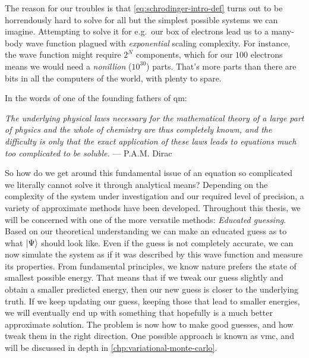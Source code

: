 \documentclass[Thesis.tex]{subfiles}
\begin{document}
The reason for our troubles is that \cref{eq:schrodinger-intro-def} turns out to
be horrendously hard to solve for all but the simplest possible systems we can
imagine. Attempting to solve it for e.g.\ our box of electrons lead us to
a many-body wave function plagued with \emph{exponential} scaling complexity.
For instance, the wave function might require $2^N$ components, which for our
$\num{100}$ electrons means we would need a \emph{nonillion} ($10^{30}$) parts. That's
more parts than there are bits in all the computers of the world, with plenty to
spare.

\begin{comment}
In most other areas of science we have been able to tame the mathematical
challenges through sophisticated high-performance computational frameworks.
Scaling complexities of $N^2$, $N^3$ or similar can usually be overcome by
simply using bigger and better computers, all the way to supercomputers with
hundreds of thousands of cores. But exponential scaling - that becomes
infeasible quickly.
\end{comment}

In the words of one of the founding fathers of \acrshort{qm}:
\begin{displayquote}
\emph{The underlying physical laws necessary for the mathematical theory of a large
part of physics and the whole of chemistry are thus completely known, and the
difficulty is only that the exact application of these laws leads to equations
much too complicated to be soluble.} --- P.A.M. Dirac
\end{displayquote}

So how do we get around this fundamental issue of an equation so complicated
we literally cannot solve it through analytical means? Depending on the
complexity of the system under investigation and our required level of
precision, a variety of approximate methods have been developed. Throughout this
thesis, we will be concerned with one of the more versatile methods:
\emph{Educated guessing}. Based on our theoretical understanding we can make an educated
guess as to what $| \Psi \rangle$ should look like. Even if the guess is not
completely accurate, we can now simulate the system as if it was described by
this wave function and measure its properties. From fundamental principles, we
know nature prefers the state of smallest possible energy. That means that if we
tweak our guess slightly and obtain a smaller predicted energy, then our new
guess is closer to the underlying truth. If we keep updating our guess, keeping
those that lead to smaller energies, we will eventually end up with something
that hopefully is a much better approximate solution. The problem is now how to
make good guesses, and how tweak them in the right direction. One possible approach is
known as \acrfull{vmc}, and will be discussed in depth in
\cref{chp:variational-monte-carlo}.\\
\end{document}
